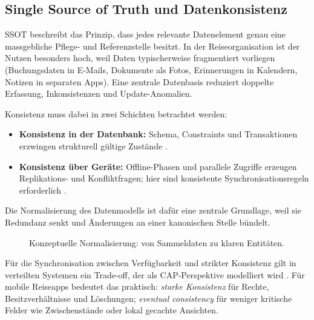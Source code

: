\subsection{Single Source of Truth und Datenkonsistenz}
SSOT beschreibt das Prinzip, dass jedes relevante Datenelement genau eine
massgebliche Pflege- und Referenzstelle besitzt. In der Reiseorganisation ist der
Nutzen besonders hoch, weil Daten typischerweise fragmentiert vorliegen
(Buchungsdaten in E-Mails, Dokumente als Fotos, Erinnerungen in Kalendern,
Notizen in separaten Apps). Eine zentrale Datenbasis reduziert doppelte Erfassung,
Inkonsistenzen und Update-Anomalien.

Konsistenz muss dabei in zwei Schichten betrachtet werden:
\begin{itemize}
  \item \textbf{Konsistenz in der Datenbank:} Schema, Constraints und
  Transaktionen erzwingen strukturell gültige Zustände
  \cite{postgresqlConstraints,postgresqlTxIsolation}.
  \item \textbf{Konsistenz über Geräte:} Offline-Phasen und parallele Zugriffe
  erzeugen Replikations- und Konfliktfragen; hier sind konsistente
  Synchronisationsregeln erforderlich \cite{capBrewer2012,dynamo2007}.
\end{itemize}

Die Normalisierung des Datenmodells ist dafür eine zentrale Grundlage, weil sie
Redundanz senkt und Änderungen an einer kanonischen Stelle bündelt.
\begin{figure}[H]
  \centering
  \caption{Konzeptuelle Normalisierung: von Sammeldaten zu klaren Entitäten.}
  \label{fig:normalization_concept}
\end{figure}

Für die Synchronisation zwischen Verfügbarkeit und strikter Konsistenz gilt in
verteilten Systemen ein Trade-off, der als CAP-Perspektive modelliert wird
\cite{capBrewer2012}. Für mobile Reiseapps bedeutet das praktisch:
\textit{starke Konsistenz} für Rechte, Besitzverhältnisse und Löschungen;
\textit{eventual consistency} für weniger kritische Felder wie
Zwischenstände oder lokal gecachte Ansichten.

